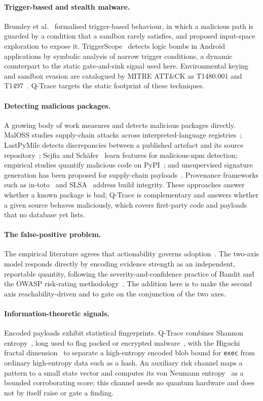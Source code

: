 \documentclass[runningheads]{llncs}
\begin{document}
\paragraph{Trigger-based and stealth malware.}
Brumley et al.~\cite{brumley} formalised trigger-based behaviour, in which a
malicious path is guarded by a condition that a sandbox rarely satisfies, and
proposed input-space exploration to expose it. TriggerScope~\cite{triggerscope}
detects logic bombs in Android applications by symbolic analysis of narrow
trigger conditions, a dynamic counterpart to the static gate-and-sink signal used
here. Environmental keying and sandbox evasion are catalogued by MITRE ATT\&CK as
T1480.001 and T1497~\cite{attack}. Q-Trace targets the static footprint of these
techniques.

\paragraph{Detecting malicious packages.}
A growing body of work measures and detects malicious packages directly. MalOSS
studies supply-chain attacks across interpreted-language
registries~\cite{maloss}; LastPyMile detects discrepancies between a published
artefact and its source repository~\cite{lastpymile}; Sejfia and
Sch\"afer~\cite{sejfia} learn features for malicious-npm detection; empirical
studies quantify malicious code on PyPI~\cite{guo}; and unsupervised signature
generation has been proposed for supply-chain payloads~\cite{backstab2}.
Provenance frameworks such as in-toto~\cite{intoto} and SLSA~\cite{slsa} address
build integrity. These approaches answer whether a known package is bad; Q-Trace
is complementary and answers whether a given source behaves maliciously, which
covers first-party code and payloads that no database yet lists.

\paragraph{The false-positive problem.}
The empirical literature agrees that actionability governs
adoption~\cite{johnson,bessey,christakis,sadowski}. The two-axis model responds
directly by encoding evidence strength as an independent, reportable quantity,
following the severity-and-confidence practice of Bandit and the OWASP
risk-rating methodology~\cite{owasp}. The addition here is to make the second
axis reachability-driven and to gate on the conjunction of the two axes.

\paragraph{Information-theoretic signals.}
Encoded payloads exhibit statistical fingerprints. Q-Trace combines Shannon
entropy~\cite{shannon}, long used to flag packed or encrypted
malware~\cite{lyda}, with the Higuchi fractal dimension~\cite{higuchi} to
separate a high-entropy encoded blob bound for \texttt{exec} from ordinary
high-entropy data such as a hash. An auxiliary risk channel maps a pattern to a
small state vector and computes its von Neumann entropy~\cite{vonneumann} as a
bounded corroborating score; this channel needs no quantum hardware and does not
by itself raise or gate a finding.
\end{document}
